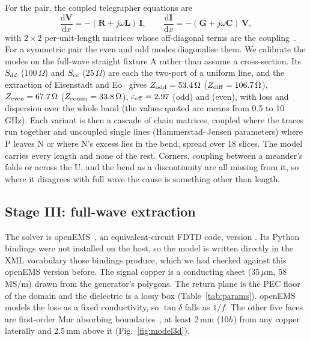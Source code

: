 For the pair, the coupled telegrapher equations are
\begin{equation}
  \frac{\mathrm{d}\mathbf{V}}{\mathrm{d}x} = -(\mathbf{R} + j\omega\mathbf{L})\,\mathbf{I}, \qquad
  \frac{\mathrm{d}\mathbf{I}}{\mathrm{d}x} = -(\mathbf{G} + j\omega\mathbf{C})\,\mathbf{V},
  \label{eq:telegrapher}
\end{equation}
with $2\times2$ per-unit-length matrices whose off-diagonal terms are the coupling~\cite{paul_mtl}. For a
symmetric pair the even and odd modes diagonalise them. We calibrate the modes on the full-wave straight fixture A rather than assume a cross-section. Its $S_{dd}$ (100\,$\Omega$) and $S_{cc}$ (25\,$\Omega$) are each the
two-port of a uniform line, and the extraction of Eisenstadt and Eo~\cite{eisenstadt1992} gives
$Z_\mathrm{odd} = 53.4\,\Omega$ ($Z_\mathrm{diff} = 106.7\,\Omega$), $Z_\mathrm{even} = 67.7\,\Omega$
($Z_\mathrm{comm} = 33.8\,\Omega$), $\varepsilon_{\mathrm{eff}} = 2.97$ (odd) and \EpsEven{} (even), with loss and dispersion over
the whole band (the values quoted are means from 0.5 to 10\,GHz). Each variant is then a cascade of chain matrices, coupled where the traces run
together and uncoupled single lines (Hammerstad--Jensen parameters) where P leaves N or where N's excess lies in
the bend, spread over 18 slices. The model carries every length and none of the rest. Corners, coupling between
a meander's folds or across the U, and the bend as a discontinuity are all missing from it, so where it disagrees
with full wave the cause is something other than length.

\subsection{Stage III: full-wave extraction}

The solver is openEMS~\cite{openems_intro,liebig2013}, an equivalent-circuit FDTD code, version
\texttt{\SolverVersion}. Its Python bindings were not installed on the host, so the model is written directly in
the XML vocabulary those bindings produce, which we had checked against this openEMS version before. The
signal copper is a conducting sheet (35\,$\mu$m, 58\,MS/m) drawn from the generator's polygons. The return plane is
the PEC floor of the domain and the dielectric is a lossy box (Table~\ref{tab:params}). openEMS models the
loss as a fixed conductivity, so $\tan\delta$ falls as $1/f$. The other five faces are first-order Mur absorbing
boundaries~\cite{mur1981}, at least 2\,mm (10$h$) from any copper laterally and 2.5\,mm above it
(Fig.~\ref{fig:model3d}).

